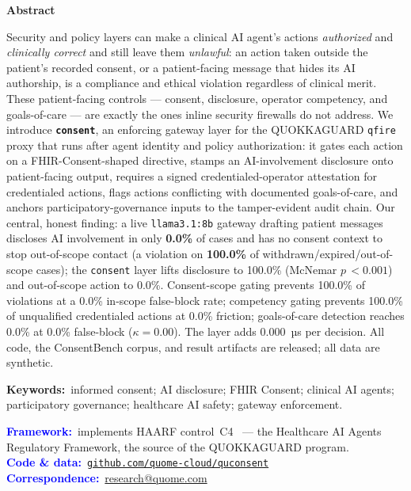 \documentclass[11pt]{article}
\providecommand{\EoneModel}{llama3.1:8b}
\providecommand{\EoneUngatedDisc}{0.0\%}
\providecommand{\EoneGatedDisc}{100.0\%}
\providecommand{\EoneMcnemarP}{<0.001}
\providecommand{\EoneViolUngated}{100.0\%}
\providecommand{\EoneViolGated}{0.0\%}
\providecommand{\EtwoCVP}{100.0\%}
\providecommand{\EtwoFBR}{0.0\%}
\providecommand{\EfourCGP}{100.0\%}
\providecommand{\EfourFriction}{0.0\%}
\providecommand{\EfiveTPR}{0.0\%}
\providecommand{\EfiveFPR}{0.0\%}
\providecommand{\EfiveKappa}{0.00}
\providecommand{\EsixPerDecisionUs}{0.000}
\begin{document}
\vspace{0.5em}
\begin{tcolorbox}[breakable, enhanced jigsaw, colback=black!4, colframe=black!4,
  arc=5pt, boxrule=0pt, left=16pt, right=16pt, top=10pt, bottom=10pt]
\setlength{\parskip}{0pt}
{\centering\large\bfseries Abstract\par}
\smallskip
\fontsize{9.5}{11.3}\selectfont
Security and policy layers can make a clinical AI agent's actions \emph{authorized}
and \emph{clinically correct} and still leave them \emph{unlawful}: an action taken
outside the patient's recorded consent, or a patient-facing message that hides its
AI authorship, is a compliance and ethical violation regardless of clinical merit.
These patient-facing controls --- consent, disclosure, operator competency, and
goals-of-care --- are exactly the ones inline security firewalls do not address. We
introduce \textbf{\texttt{consent}}, an enforcing gateway layer for the QUOKKAGUARD
\texttt{qfire} proxy that runs after agent identity and policy authorization: it
gates each action on a FHIR-Consent-shaped directive, stamps an AI-involvement
disclosure onto patient-facing output, requires a signed credentialed-operator
attestation for credentialed actions, flags actions conflicting with documented
goals-of-care, and anchors participatory-governance inputs to the tamper-evident
audit chain. Our central, honest finding: a live \texttt{\EoneModel{}} gateway
drafting patient messages discloses AI involvement in only \textbf{\EoneUngatedDisc{}}
of cases and has no consent context to stop out-of-scope contact (a violation on
\textbf{\EoneViolUngated{}} of withdrawn/expired/out-of-scope cases); the
\texttt{consent} layer lifts disclosure to \EoneGatedDisc{} (McNemar $p\,\EoneMcnemarP$)
and out-of-scope action to \EoneViolGated{}. Consent-scope gating prevents
\EtwoCVP{} of violations at a \EtwoFBR{} in-scope false-block rate; competency
gating prevents \EfourCGP{} of unqualified credentialed actions at \EfourFriction{}
friction; goals-of-care detection reaches \EfiveTPR{} at \EfiveFPR{} false-block
($\kappa=\EfiveKappa$). The layer adds \EsixPerDecisionUs{}~µs per decision. All
code, the ConsentBench corpus, and result artifacts are released; all data are
synthetic.

\medskip
\noindent\textbf{Keywords:}~informed consent; AI disclosure; FHIR Consent; clinical
AI agents; participatory governance; healthcare AI safety; gateway enforcement.

\medskip
\noindent\textcolor{blue}{\textbf{Framework:}}~implements HAARF control~C4~\cite{schwoebel2026haarf} --- the Healthcare AI Agents Regulatory Framework, the source of the QUOKKAGUARD program.\\
\noindent\textcolor{blue}{\textbf{Code \& data:}}~\href{https://github.com/quome-cloud/quconsent}{\texttt{github.com/quome-cloud/quconsent}}\\
\noindent\textcolor{blue}{\textbf{Correspondence:}}~\href{mailto:research@quome.com}{research@quome.com}
\end{tcolorbox}
\end{document}
